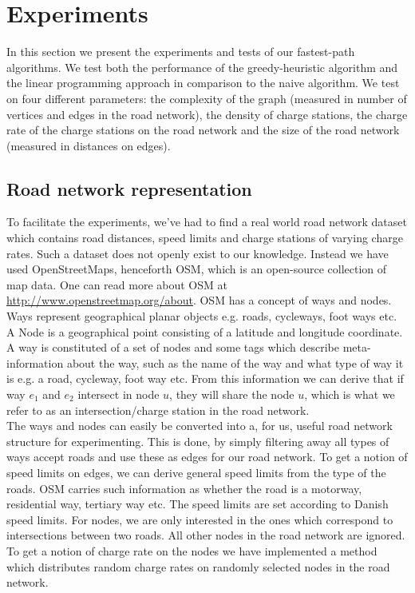 \section{Experiments}
\label{sec:experiments}
In this section we present the experiments and tests of our fastest-path algorithms. We test both the performance of the greedy-heuristic algorithm and the linear programming approach in comparison to the naive algorithm. We test on four different parameters: the complexity of the graph (measured in number of vertices and edges in the road network), the density of charge stations, the charge rate of the charge stations on the road network and the size of the road network (measured in distances on edges).

\subsection{Road network representation} 
\label{sub:setup}
To facilitate the experiments, we've had to find a real world road network dataset which contains road distances, speed limits and charge stations of varying charge rates. Such a dataset does not openly exist to our knowledge. Instead we have used OpenStreetMaps, henceforth OSM, which is an open-source collection of map data. One can read more about OSM at \url{http://www.openstreetmap.org/about}. OSM has a concept of ways and nodes. Ways represent geographical planar objects e.g. roads, cycleways, foot ways etc. A Node is a geographical point consisting of a latitude and longitude coordinate. A way is constituted of a set of nodes and some tags which describe meta-information about the way, such as the name of the way and what type of way it is e.g. a road, cycleway, foot way  etc. From this information we can derive that if way $e_1$ and $e_2$ intersect in node $u$, they will share the node $u$, which is what we refer to as an intersection/charge station in the road network.\\

The ways and nodes can easily be converted into a, for us, useful road network structure for experimenting. This is done, by simply filtering away all types of ways accept roads and use these as edges for our road network. To get a notion of speed limits on edges, we can derive general speed limits from the type of the roads. OSM carries such information as whether the road is a motorway, residential way, tertiary way etc. The speed limits are set according to Danish speed limits. For nodes, we are only interested in the ones which correspond to intersections between two roads. All other nodes in the road network are ignored. To get a notion of charge rate on the nodes we have implemented a method which distributes random charge rates on randomly selected nodes in the road network.

